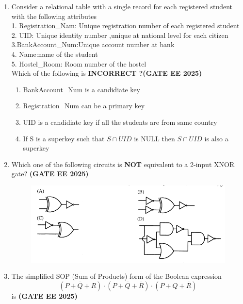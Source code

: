 \documentclass[journal,12pt,onecolumn]{IEEEtran}
\theoremstyle{remark}
\begin{document}
\begin{enumerate}
\item Consider a relational table with a single record for each registered student with the following attributes
\\
1. Registration\_Nam: Unique registration number of each registered student
\\
2. UID: Unique identity number ,unique at national level for each citizen 
\\
3.BankAccount\_Num:Unique account number at bank
\\
4. Name:name of the student 
\\
5. Hostel\_Room: Room number of the hostel 
\\
Which of the following is \textbf{INCORRECT ?}\hfill \textbf{(GATE EE 2025)}
\begin{enumerate}
    \item BankAccount\_Num is a candidiate key
    \item Registration\_Num  can be a primary key 
    \item UID is a candidiate key if all the students are from same country
    \item If S is a superkey such that $S\cap UID$ is NULL then $S\cap UID$ is also a superkey
\end{enumerate}
\item Which one of the following circuits is \textbf{NOT} equivalent to a 2-input XNOR  gate? \hfill \textbf{(GATE EE 2025)}
\begin{figure}[h]
    \centering
    \includegraphics[width=0.9\linewidth]{figs/fig1.png}
    \caption{ }
    \label{fig1}
\end{figure}


\item The simplified SOP (Sum of Products) form of the Boolean expression
\[
    (P + \overline{Q} + R) \cdot (P + \overline{Q} + \overline{R}) \cdot (P + Q + \overline{R})
\]
is \hfill \textbf{(GATE EE 2025)}
\begin{enumerate}
\end{enumerate}



\end{enumerate}
\end{document}
